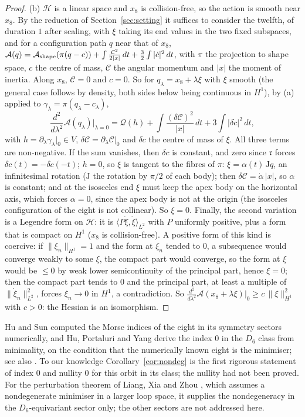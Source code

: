 \documentclass[11pt]{article}
\theoremstyle{definition}
\begin{document}
\begin{proof}
(b) $\mathcal H$ is a linear space and $x_8$ is collision-free, so the action is smooth near $x_8$. By the reduction of
Section~\ref{sec:setting} it suffices to consider the twelfth, of duration $1$ after scaling, with $\xi$ taking its end values in the two fixed
subspaces, and for a configuration path $q$ near that of $x_8$,
$\mathcal A(q)=\mathcal A_{\rm shape}(\pi(q-c))+\int\frac{\mathcal C^2}{2|x|}\,dt+\frac32\int|\dot c|^2\,dt$, with $\pi$ the
projection to shape space, $c$ the centre of mass, $\mathcal C$ the angular momentum and $|x|$ the moment of inertia. Along
$x_8$, $\mathcal C=0$ and $c=0$. So for $q_\lambda=x_8+\lambda\xi$ with $\xi$ smooth (the general case follows by density, both sides below being
continuous in $H^1$), by (a) applied to $\gamma_\lambda=\pi(q_\lambda-c_\lambda)$,
\[
\frac{d^2}{d\lambda^2}\mathcal A(q_\lambda)\Big|_{\lambda=0}=\mathcal Q(h)+\int\frac{(\delta\mathcal C)^2}{|x|}\,dt+3\int|\delta\dot c|^2\,dt,
\]
with $h=\partial_\lambda\gamma_\lambda|_0\in V$, $\delta\mathcal C=\partial_\lambda\mathcal C|_0$ and $\delta c$ the centre of mass of $\xi$.
All three terms are non-negative. If the sum vanishes, then $\delta c$ is constant, and zero since $\mathfrak r$ forces
$\delta c(t)=-\delta c(-t)$; $h=0$, so $\xi$ is tangent to the fibres of $\pi$: $\xi=\alpha(t)\,\mathrm Jq$, an
infinitesimal rotation ($\mathrm J$ the rotation by $\pi/2$ of each body); then $\delta\mathcal C=\dot\alpha\,|x|$, so $\alpha$ is
constant; and at the isosceles end $\xi$ must keep the apex body on the horizontal axis, which forces $\alpha=0$,
since the apex body is not at the origin (the isosceles configuration of the eight is not collinear). So $\xi=0$.
Finally, the second variation is a Legendre form on $\mathcal H$: it is $\langle P\dot\xi,\dot\xi\rangle_{L^2}$ with $P$
uniformly positive, plus a form that is compact on $H^1$ ($x_8$ is collision-free). A positive form of this kind is
coercive: if $\|\xi_n\|_{H^1}=1$ and the form at $\xi_n$ tended to $0$, a subsequence would converge weakly to some
$\xi$, the compact part would converge, so the form at $\xi$ would be $\le0$ by weak lower semicontinuity of the principal
part, hence $\xi=0$; then the compact part tends to $0$ and the principal part, at least a multiple of
$\|\dot\xi_n\|^2_{L^2}$, forces $\xi_n\to0$ in $H^1$, a contradiction. So
$\frac{d^2}{d\lambda^2}\mathcal A(x_8+\lambda\xi)|_0\ge c\,\|\xi\|_{H^1}^2$ with $c>0$: the Hessian is an isomorphism.
\end{proof}
Hu and Sun \cite{HuSun} computed the Morse indices of the eight in its symmetry sectors numerically, and Hu, Portaluri
and Yang \cite[Remark~1.7]{HPY} derive the index $0$ in the $D_6$ class from minimality, on the condition that the
numerically known eight is the minimiser; see also \cite{FFO18,Fenucci}. To our knowledge Corollary~\ref{cor:nondeg}
is the first rigorous statement of index $0$ and nullity $0$ for this orbit in its class; the nullity had not been
proved. For the perturbation theorem of Liang, Xia and Zhou \cite{LXZ}, which assumes a nondegenerate minimiser in a
larger loop space, it supplies the nondegeneracy in the $D_6$-equivariant sector only; the other sectors are not
addressed here.
\end{document}
